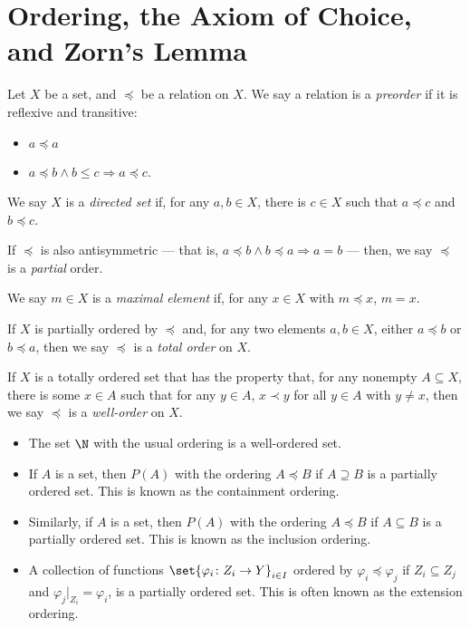 \section{Ordering, the Axiom of Choice, and Zorn's Lemma}%
\begin{definition}\label{def:ordered_sets}
Let $X$ be a set, and $\preceq $ be a relation on $X$. We say a relation is a \textit{preorder} if it is reflexive and transitive:
\begin{itemize}
  \item $a\preceq a$
  \item $a\preceq b \wedge b\leq c\Rightarrow a\preceq c$.
\end{itemize}
We say $X$ is a \textit{directed set} if, for any $a,b\in X$, there is $c\in X$ such that $a\preceq c$ and $b\preceq c$.\newline

If $\preceq$ is also antisymmetric --- that is, $a\preceq b\wedge b\preceq a \Rightarrow a = b$ --- then, we say $\preceq$ is a \textit{partial} order.\newline

We say $m\in X$ is a \textit{maximal element} if, for any $x\in X$ with $m\preceq x$, $m = x$.\newline

If $X$ is partially ordered by $\preceq$ and, for any two elements $a,b\in X$, either $a\preceq b$ or $b\preceq a$, then we say $\preceq$ is a \textit{total order} on $X$.\newline

If $X$ is a totally ordered set that has the property that, for any nonempty $A\subseteq X$, there is some $x\in A$ such that for any $y\in A$, $x\prec y$ for all $y \in A$ with $y\neq x$, then we say $\preceq$ is a \textit{well-order} on $X$.
\end{definition}
\begin{example}\hfill
  \begin{itemize}
    \item The set $\N$ with the usual ordering is a well-ordered set.
    \item If $A$ is a set, then $P(A)$ with the ordering $A\preceq B$ if $A\supseteq B$ is a partially ordered set. This is known as the containment ordering.
    \item Similarly, if $A$ is a set, then $P(A)$ with the ordering $A\preceq B$ if $A\subseteq B$ is a partially ordered set. This is known as the inclusion ordering.
    \item A collection of functions $\set{\varphi_{i}\colon Z_i\rightarrow Y}_{i\in I}$ ordered by $\varphi_{i}\preceq \varphi_j$ if $Z_i\subseteq Z_j$ and $\varphi_{j}|_{Z_i} = \varphi_i$, is a partially ordered set. This is often known as the extension ordering.
  \end{itemize}
\end{example}
